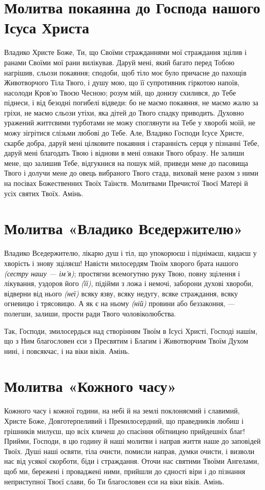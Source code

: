 \documentclass[chapters.tex]{subfiles}
\begin{document}
\section{Молитва покаянна до Господа нашого Ісуса Христа}
Владико Христе Боже, Ти, що Своїми стражданнями мої страждання зцілив і ранами Своїми мої рани вилікував. Даруй мені, який багато перед Тобою нагрішив, сльози покаяння; сподоби, щоб тіло моє було причасне до пахощів Животворчого Тіла Твого, і душу мою, що її супротивник гіркотою напоїв, насолоди Кров’ю Твоєю Чесною; розум мій, що донизу схилився, до Тебе піднеси, і від безодні погибелі відведи: бо не маємо покаяння, не маємо жалю за гріхи, не маємо сльози утіхи, яка дітей до Твого спадку приводить. Духовно уражений життєвими турботами не можу споглянути на Тебе у хворобі моїй, не можу зігрітися слізьми любові до Тебе. Але, Владико Господи Ісусе Христе, скарбе добра, даруй мені цілковите покаяння і старанність серця у пізнанні Тебе, даруй мені благодать Твою і віднови в мені ознаки Твого образу. Не залиши мене, що залишив Тебе, відгукнися на пошук мій, приведи мене до пасовища Твого і долучи мене до овець вибраного Твого стада, виховай мене разом з ними на посівах Божественних Твоїх Таїнств. Молитвами Пречистої Твоєї Матері й усіх святих Твоїх. Амінь.

\section{Молитва «Владико Вседержителю»}
Владико Вседержителю, лікарю душ і тіл, що упокорюєш і піднімаєш, кидаєш у хворість і знову зціляєш! Навісти милосердям Твоїм хворого брата нашого \emph{(сестру нашу — ім’я)}; простягни всемогутню руку Твою, повну зцілення і лікування, уздоров його \emph{(її)}, підійми з ложа і немочі, заборони духові хвороби, відверни від нього \emph{(неї)} всяку язву, всяку недугу, всяке страждання, всяку огневицю і трясовицю. А як є на ньому \emph{(ній)} провини або беззаконня, — полегши, залиши, прости ради Твого чоловіколюбства.

Так, Господи, змилосердься над створінням Твоїм в Ісусі Христі, Господі нашім, що з Ним благословен єси з Пресвятим і Благим і Животворчим Твоїм Духом нині, і повсякчас, і на віки віків. Амінь.

\section{Молитва «Кожного часу»}
Кожного часу і кожної години, на небі й на землі поклоняємий і славимий, Христе Боже, Довготерпеливий і Премилосердний, що праведників любиш і грішників милуєш, що всіх кличеш до спасіння обітницею прийдешніх благ! Прийми, Господи, в цю годину й наші молитви і направ життя наше до заповідей Твоїх. Душі наші освяти, тіла очисти, помисли направ, думки очисти, і визволи нас від усякої скорботи, біди і страждання. Оточи нас святими Твоїми Ангелами, щоб ми, бережені і проваджені ними, прийшли до єдності віри і до пізнання неприступної Твоєї слави, бо Ти благословен єси на віки віків. Амінь.
\end{document}
